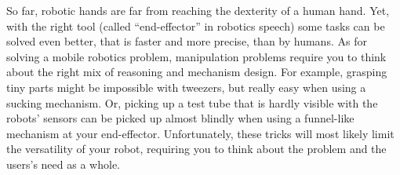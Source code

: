 So far, robotic hands are far from reaching the dexterity of a human hand. Yet, with the right tool (called ``end-effector'' in robotics speech)  some tasks can be solved even better, that is faster and more precise, than by humans. As for solving a mobile robotics problem, manipulation problems require you to think about the right mix of reasoning and mechanism design. For example, grasping tiny parts might be impossible with tweezers, but really easy when using a sucking mechanism. Or, picking up a test tube that is hardly visible with the robots' sensors can be picked up almost blindly when using a funnel-like mechanism at your end-effector. Unfortunately, these tricks will most likely limit the versatility of your robot, requiring you to think about the problem and the users's need as a whole.




